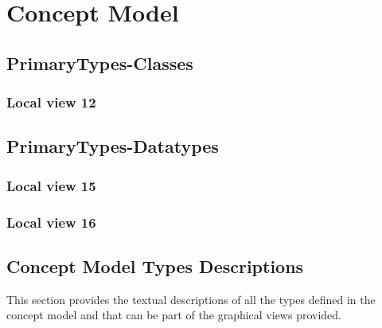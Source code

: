 
\chapter{Concept Model}
\label{chap:lu.uni.lassy.excalibur.group09.spec-CM}


\section{PrimaryTypes-Classes}
\subsection{Local view 12}
\label{sec:lu.uni.lassy.excalibur.group09.spec-CM-view-local-PrimaryTypes-Classes-12}




\section{PrimaryTypes-Datatypes}
\subsection{Local view 15}
\label{sec:lu.uni.lassy.excalibur.group09.spec-CM-view-local-PrimaryTypes-Datatypes-15}

\subsection{Local view 16}
\label{sec:lu.uni.lassy.excalibur.group09.spec-CM-view-local-PrimaryTypes-Datatypes-16}










\section{Concept Model Types Descriptions}
This section provides the textual descriptions of all the types defined in the concept model and that can be part of the graphical views provided.

